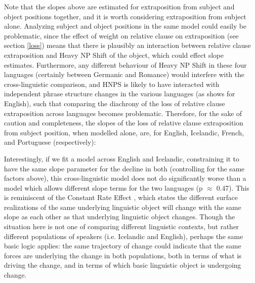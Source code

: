Note that the slopes above are estimated for extraposition from subject and object positions together, and it is worth considering extraposition from subject alone. Analyzing subject and object positions in the same model could easily be problematic, since the effect of weight on relative clause on extraposition (see section \ref{loss}) means that there is plausibly an interaction between relative clause extraposition and Heavy NP Shift of the object, which could effect slope estimates. Furthermore, any different behaviour of Heavy NP Shift in these four languages (certainly between Germanic and Romance) would interfere with the cross-linguistic comparison, and HNPS is likely to have interacted with independent phrase structure changes in the various languages (as \citealt{wallenberg2015} shows for English), such that comparing the diachrony of the loss of relative clause extraposition across languages becomes problematic. Therefore, for the sake of caution and completeness, the slopes of the loss of relative clause extraposition from subject position, when modelled alone, are, for English, Icelandic, French, and Portuguese (respectively): 


Interestingly, if we fit a model across English and Icelandic, constraining it to have the same slope parameter for the decline in both (controlling for the same factors above), this cross-linguistic model does not do significantly worse than a model which allows different slope terms for the two languages (p $\approx$ 0.47). This is reminiscent of the Constant Rate Effect \citep[][among others]{kroch1989, pintzuk1991, santorini1993a}, which states the different surface realizations of the same underlying linguistic object will change with the same slope as each other as that underlying linguistic object changes. Though the situation here is not one of comparing different linguistic contexts, but rather different populations of speakers (i.e. Icelandic and English), perhaps the same basic logic applies: the same trajectory of change could indicate that the same forces are underlying the change in both populations, both in terms of what is driving the change, and in terms of which basic linguistic object is undergoing change. 

